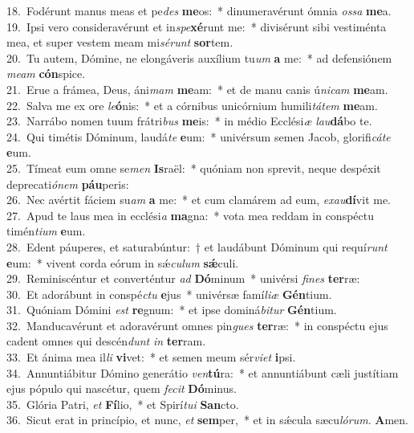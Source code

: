 {18.~}Fodérunt manus meas et pe\textit{des} \textbf{me}os:~* dinumeravérunt ómnia \textit{os}\textit{sa} \textbf{me}a.\\
{19.~}Ipsi vero consideravérunt et in\textit{spe}\textbf{xé}runt me:~* divisérunt sibi vestiménta mea, et super vestem meam mi\textit{sé}\textit{runt} \textbf{sor}tem.\\
{20.~}Tu autem, Dómine, ne elongáveris auxílium tu\textit{um} \textbf{a} me:~* ad defensiónem \textit{me}\textit{am} \textbf{cón}spice.\\
{21.~}Erue a frámea, Deus, áni\textit{mam} \textbf{me}am:~* et de manu canis ú\textit{ni}\textit{cam} \textbf{me}am.\\
{22.~}Salva me ex ore \textit{le}\textbf{ó}nis:~* et a córnibus unicórnium humili\textit{tá}\textit{tem} \textbf{me}am.\\
{23.~}Narrábo nomen tuum frátri\textit{bus} \textbf{me}is:~* in médio Ecclési\textit{æ} \textit{lau}\textbf{dá}bo te.\\
{24.~}Qui timétis Dóminum, laudá\textit{te} \textbf{e}um:~* univérsum semen Jacob, glorifi\textit{cá}\textit{te} \textbf{e}um.\\
{25.~}Tímeat eum omne se\textit{men} \textbf{Is}raël:~* quóniam non sprevit, neque despéxit deprecati\textit{ó}\textit{nem} \textbf{páu}peris:\\
{26.~}Nec avértit fáciem su\textit{am} \textbf{a} me:~* et cum clamárem ad eum, \textit{e}\textit{xau}\textbf{dí}vit me.\\
{27.~}Apud te laus mea in ecclési\textit{a} \textbf{ma}gna:~* vota mea reddam in conspéctu timén\textit{ti}\textit{um} \textbf{e}um.\\
{28.~}Edent páuperes, et saturabúntur:~† et laudábunt Dóminum qui requí\textit{runt} \textbf{e}um:~* vivent corda eórum in sǽ\textit{cu}\textit{lum} \textbf{sǽ}culi.\\
{29.~}Reminiscéntur et converténtur \textit{ad} \textbf{Dó}minum~* univérsi \textit{fi}\textit{nes} \textbf{ter}ræ:\\
{30.~}Et adorábunt in conspé\textit{ctu} \textbf{e}jus~* univérsæ famí\textit{li}\textit{æ} \textbf{Gén}tium.\\
{31.~}Quóniam Dómini \textit{est} \textbf{re}gnum:~* et ipse dominá\textit{bi}\textit{tur} \textbf{Gén}tium.\\
{32.~}Manducavérunt et adoravérunt omnes pin\textit{gues} \textbf{ter}ræ:~* in conspéctu ejus cadent omnes qui descén\textit{dunt} \textit{in} \textbf{ter}ram.\\
{33.~}Et ánima mea il\textit{li} \textbf{vi}vet:~* et semen meum sér\textit{vi}\textit{et} \textbf{i}psi.\\
{34.~}Annuntiábitur Dómino generátio \textit{ven}\textbf{tú}ra:~* et annuntiábunt cæli justítiam ejus pópulo qui nascétur, quem \textit{fe}\textit{cit} \textbf{Dó}minus.\\
{35.~}Glória Patri, \textit{et} \textbf{Fí}lio,~* et Spirí\textit{tu}\textit{i} \textbf{San}cto.\\
{36.~}Sicut erat in princípio, et nunc, \textit{et} \textbf{sem}per,~* et in sǽcula sæcu\textit{ló}\textit{rum}. \textbf{A}men.\\
